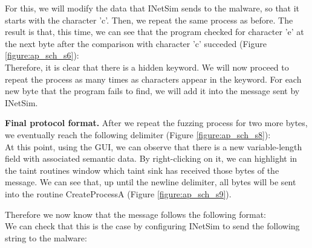 \documentclass[conference]{IEEEtran}
\begin{document}
For this, we will modify the data that INetSim sends to the malware, so that it starts with the character 'c'.
Then, we repeat the same process as before. The result is that, this time, we can see that the program
checked for character 'e' at the next byte after the comparison with character 'c' succeded (Figure \ref{figure:ap_sch_s6}):
\noindent{}\\

Therefore, it is clear that there is a hidden keyword. We will now proceed to repeat the process
as many times as characters appear in the keyword. For each new byte that the program fails to find,
we will add it into the message sent by INetSim.

\textbf{Final protocol format.}
After we repeat the fuzzing process for two more bytes, we eventually reach the following delimiter (Figure \ref{figure:ap_sch_s8}):
\noindent{}\\

At this point, using the GUI, we can observe that there is a new variable-length field with associated semantic data.
By right-clicking on it, we can highlight in the taint routines window which taint sink has received those bytes of the
message. We can see that, up until the newline delimiter, all bytes will be sent into the routine CreateProcessA
(Figure \ref{figure:ap_sch_s9}). 

Therefore we now know that the message follows the following format:
\noindent{}\\

We can check that this is the case by configuring INetSim to send the following string to the malware:
\noindent{}\\
\end{document}
